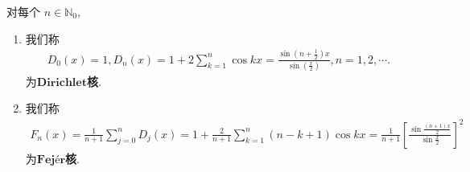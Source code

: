 \documentclass[../../main.tex]{subfiles}
\begin{document}
\begin{definition}
对每个 $n \in \mathbb{N}_0$,
\begin{enumerate}
\item 我们称
\begin{gather}\label{eq:--------::24--18.25}
D_0(x) = 1, D_n(x) = 1 + 2\sum_{k = 1}^{n} \cos kx = \frac{\sin\left(n + \frac{1}{2}\right)x}{\sin\left(\frac{x}{2}\right)}, n = 1, 2, \cdots. 
\end{gather}
为$\mathbf{Dirichlet}$\textbf{核}.

\item 我们称
\begin{align}
F_n(x) = \frac{1}{n + 1}\sum_{j = 0}^{n} D_j(x) = 1 + \frac{2}{n + 1}\sum_{k = 1}^{n} (n - k + 1)\cos kx = \frac{1}{n + 1} \left[ \frac{\sin\frac{(n + 1)x}{2}}{\sin\frac{x}{2}} \right]^2 \label{eq::;23428798797--18.26}
\end{align}
为$\mathbf{Fejér}$\textbf{核}.
\end{enumerate}
\end{definition}
\end{document}
